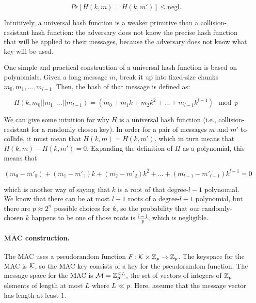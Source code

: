 $$
Pr[H(k, m) = H(k, m')] \leq \text{negl.}
$$

Intuitively, a universal hash function is a weaker primitive than a
collision-resistant hash function: the adversary does not know the
precise hash function that will be applied to their messages, because
the adversary does not know what key will be used.

One simple and practical construction of a universal hash function
is based on polynomials.  Given a long message $m$, break it up into
fixed-size chunks $m_0, m_1, \ldots, m_{l-1}$.  Then,
the hash of that message is defined as:

$$
H(k, m_0 || m_1 || \ldots || m_{l-1}) = (m_0 + m_1 k + m_2 k^2 +
  \ldots + m_{l-1} k^{l-1}) \mod p
$$

We can give some intuition for why $H$ is a universal hash function
(i.e., collision-resistant for a randomly chosen key).  In order for
a pair of messages $m$ and $m'$ to collide, it must mean that
$H(k, m) = H(k, m')$, which in turn means that $H(k, m) - H(k, m') = 0$.
Expanding the definition of $H$ as a polynomial, this means that

$$
(m_0 - m'_0) + (m_1 - m'_1) k + (m_2 - m'_2) k^2 + \ldots + (m_{l-1} - m'_{l-1}) k^{l-1} = 0
$$

which is another way of saying that $k$ is a root of that degree-$l-1$
polynomial.  We know that there can be at most $l-1$ roots of a
degree-$l-1$ polynomial, but there are $p \approx 2^n$ possible choices
for $k$, so the probability that our randomly-chosen $k$ happens to be
one of those roots is $\frac{l-1}{p}$, which is negligible.

\paragraph{MAC construction.}

The MAC uses a pseudorandom function 
$F \colon \mathcal{K} \times \mathbb{Z}_p \to \mathbb{Z}_p$.
The keyspace for the MAC is $\mathcal{K}$, so the MAC key consists of a key for 
the pseudorandom function.
The message space for the MAC is $\mathcal{M} = \mathbb{Z}_p^{\leq L}$,
the set of vectors of integers of $\mathbb{Z}_p$ elements of length
at most $L$ where $L \ll p$.
Here, assume that the message vector has length at least $1$.

